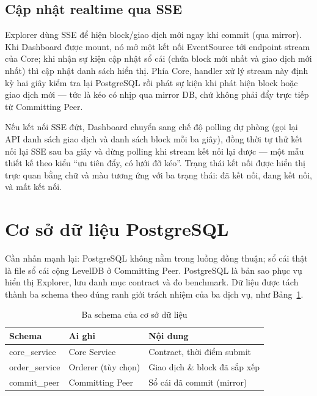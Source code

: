 \subsection{Cập nhật realtime qua SSE}

Explorer dùng SSE để hiện block/giao dịch mới ngay khi commit (qua mirror).
Khi Dashboard được mount, nó mở một kết nối EventSource tới endpoint stream
của Core; khi nhận sự kiện cập nhật sổ cái (chứa block mới nhất và giao dịch
mới nhất) thì cập nhật danh sách hiển thị. Phía Core, handler xử lý stream
này định kỳ hai giây kiểm tra lại PostgreSQL rồi phát sự kiện khi phát hiện
block hoặc giao dịch mới --- tức là kéo có nhịp qua mirror DB, chứ không phải
đẩy trực tiếp từ Committing Peer.

Nếu kết nối SSE đứt, Dashboard chuyển sang chế độ polling dự phòng (gọi lại
API danh sách giao dịch và danh sách block mỗi ba giây), đồng thời tự thử kết
nối lại SSE sau ba giây và dừng polling khi stream kết nối lại được --- một
mẫu thiết kế theo kiểu ``ưu tiên đẩy, có lưới đỡ kéo''. Trạng thái kết nối
được hiển thị trực quan bằng chữ và màu tương ứng với ba trạng thái: đã kết
nối, đang kết nối, và mất kết nối.

\section{Cơ sở dữ liệu PostgreSQL}
\label{sec:postgres}

Cần nhấn mạnh lại: PostgreSQL không nằm trong luồng đồng thuận; sổ cái thật
là file sổ cái cộng LevelDB ở Committing Peer. PostgreSQL là bản sao phục vụ
hiển thị Explorer, lưu danh mục contract và đo benchmark. Dữ liệu được tách
thành ba schema theo đúng ranh giới trách nhiệm của ba dịch vụ, như
Bảng~\ref{tab:schemas}.

\begin{table}[H]
\centering
\caption{Ba schema của cơ sở dữ liệu}
\label{tab:schemas}
\begin{tabular}{@{}p{3cm}p{3.4cm}p{5.4cm}@{}}
\toprule
Schema & Ai ghi & Nội dung \\
\midrule
core\_service & Core Service & Contract, thời điểm submit \\
order\_service & Orderer (tùy chọn) & Giao dịch \& block đã sắp xếp \\
commit\_peer & Committing Peer & Sổ cái đã commit (mirror) \\
\bottomrule
\end{tabular}
\end{table}

